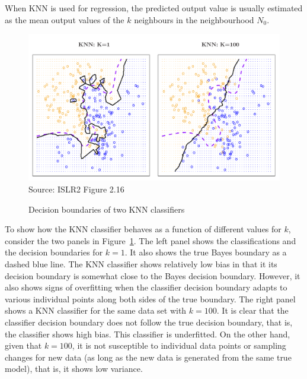 When KNN is used for regression, the predicted output value is usually estimated as the mean output values of the $k$ neighbours in the neighbourhood $N_0$.

\begin{figure}
\centering
\includegraphics[width=.75\textwidth]{Figures_Chapters_1-6/Chapter2/2_16.pdf} \\
\vspace{3mm}
\scriptsize Source: ISLR2 Figure 2.16
\caption{Decision boundaries of two KNN classifiers}
\label{fig:knn2}
\end{figure}

To show how the KNN classifier behaves as a function of different values for $k$, consider the two panels in Figure~\ref{fig:knn2}. The left panel shows the classifications and the decision boundaries for $k=1$. It also shows the true Bayes boundary as a dashed blue line. The KNN classifier shows relatively low bias in that it its decision boundary is somewhat close to the Bayes decision boundary. However, it also shows signs of overfitting when the classifier decision boundary adapts to various individual points along both sides of the true boundary. The right panel shows a KNN classifier for the same data set with $k=100$. It is clear that the classifier decision boundary does not follow the true decision boundary, that is, the classifier shows high bias. This classifier is underfitted. On the other hand, given that $k=100$, it is not susceptible to individual data points or sampling changes for new data (as long as the new data is generated from the same true model), that is, it shows low variance. 


